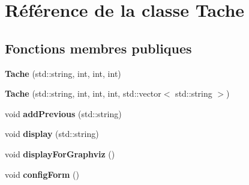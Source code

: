 \hypertarget{class_tache}{\section{Référence de la classe Tache}
\label{class_tache}
}
\subsection*{Fonctions membres publiques}
\begin{DoxyCompactItemize}
\item 
\hypertarget{class_tache_a6170b813e1a27599ad8537210d4c6a73}{{\bfseries Tache} (std\-::string, int, int, int)}\label{class_tache_a6170b813e1a27599ad8537210d4c6a73}

\item 
\hypertarget{class_tache_a9241ace26154b8843d1479d3ce009ecb}{{\bfseries Tache} (std\-::string, int, int, int, std\-::vector$<$ std\-::string $>$)}\label{class_tache_a9241ace26154b8843d1479d3ce009ecb}

\item 
\hypertarget{class_tache_a7ec08d5bd9391c93ce800a7e5e23aab7}{void {\bfseries add\-Previous} (std\-::string)}\label{class_tache_a7ec08d5bd9391c93ce800a7e5e23aab7}

\item 
\hypertarget{class_tache_aaac93ad74254a4e995ecc9843bef0708}{void {\bfseries display} (std\-::string)}\label{class_tache_aaac93ad74254a4e995ecc9843bef0708}

\item 
\hypertarget{class_tache_a7d4f76406c56af8fb040b5656db29efa}{void {\bfseries display\-For\-Graphviz} ()}\label{class_tache_a7d4f76406c56af8fb040b5656db29efa}

\item 
\hypertarget{class_tache_a2f22533ac40c5b2164ce07c41ad342e0}{void {\bfseries config\-Form} ()}\label{class_tache_a2f22533ac40c5b2164ce07c41ad342e0}

\end{DoxyCompactItemize}
